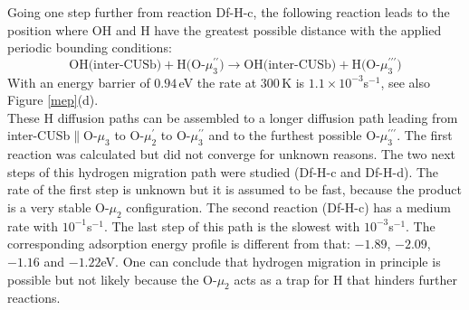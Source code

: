 \documentclass[11pt,DIV=13,BCOR=5mm,a4paper,headinclude]{scrbook}
\begin{document}
Going one step further from reaction Df-H-c, the following reaction leads to the position where OH and H have the greatest possible distance with the applied periodic bounding conditions:
\begin{equation}
 \text{OH(inter-CUSb)} + \text{H(O-$\mu_3^{\prime\prime}$)} \rightarrow \text{OH(inter-CUSb)} + \text{H(O-$\mu_3^{\prime\prime\prime}$)} \tag{Df-H-d}
     \label{diffHd}
\end{equation}
With an energy barrier of $0.94\,$eV the rate at $300\,$K is $1.1\times 10^{-3}$s$^{-1}$, see also Figure \ref{mep}(d).
\\
These H diffusion paths can be assembled to a longer diffusion path leading from inter-CUSb$\parallel$O-$\mu_3$ to O-$\mu_2^\prime$ to O-$\mu_3^{\prime\prime}$ and to the furthest possible O-$\mu_3^{\prime\prime\prime}$.
The first reaction was calculated but did not converge for unknown reasons.
The two next steps of this hydrogen migration path were studied (Df-H-c and Df-H-d).
The rate of the first step is unknown but it is assumed to be fast, because the product is a very stable O-$\mu_2$ configuration.
The second reaction (Df-H-c) has a medium rate with $10^{-1}$s$^{-1}$.
The last step of this path is the slowest with $10^{-3}$s$^{-1}$.
The corresponding adsorption energy profile is different from that: $-1.89$, $-2.09$, $-1.16$ and $-1.22$eV.
One can conclude that hydrogen migration in principle is possible but not likely because the O-$\mu_2$ acts as a trap for H that hinders further reactions.
\\
\end{document}
